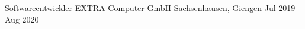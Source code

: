 
\begin{cventries}
  \cventry
    {Softwareentwickler} %
    {EXTRA Computer GmbH} %
    {Sachsenhausen, Giengen} %
    {Jul 2019 - Aug 2020} %
    {
    }




\end{cventries}
